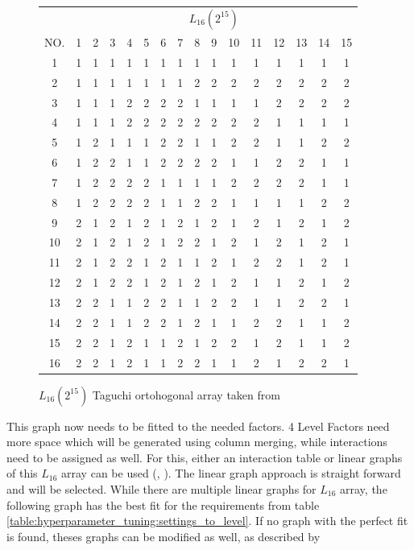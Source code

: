 \begin{figure}[H]
	\centering
\begin{tabular}{ |c||c|c|c|c|c|c|c|c|c|c|c|c|c|c|c|  }
	\hline
	   & \multicolumn{15}{|c|}{ $L_{16}(2^{15})$ } \\
	NO.& 1 & 2 & 3 & 4 & 5 & 6 & 7 & 8 & 9 & 10& 11& 12& 13& 14&15\\
	\hline
	1  & 1 & 1 & 1 & 1 & 1 & 1 & 1 & 1 & 1 & 1 & 1 & 1 & 1 & 1 & 1\\
	2  & 1 & 1 & 1 & 1 & 1 & 1 & 1 & 2 & 2 & 2 & 2 & 2 & 2 & 2 & 2\\
	3  & 1 & 1 & 1 & 2 & 2 & 2 & 2 & 1 & 1 & 1 & 1 & 2 & 2 & 2 & 2\\
	4  & 1 & 1 & 1 & 2 & 2 & 2 & 2 & 2 & 2 & 2 & 2 & 1 & 1 & 1 & 1\\
	5  & 1 & 2 & 1 & 1 & 1 & 2 & 2 & 1 & 1 & 2 & 2 & 1 & 1 & 2 & 2\\
	6  & 1 & 2 & 2 & 1 & 1 & 2 & 2 & 2 & 2 & 1 & 1 & 2 & 2 & 1 & 1\\
	7  & 1 & 2 & 2 & 2 & 2 & 1 & 1 & 1 & 1 & 2 & 2 & 2 & 2 & 1 & 1\\
	8  & 1 & 2 & 2 & 2 & 2 & 1 & 1 & 2 & 2 & 1 & 1 & 1 & 1 & 2 & 2\\
	9  & 2 & 1 & 2 & 1 & 2 & 1 & 2 & 1 & 2 & 1 & 2 & 1 & 2 & 1 & 2\\
	10 & 2 & 1 & 2 & 1 & 2 & 1 & 2 & 2 & 1 & 2 & 1 & 2 & 1 & 2 & 1\\
	11 & 2 & 1 & 2 & 2 & 1 & 2 & 1 & 1 & 2 & 1 & 2 & 2 & 1 & 2 & 1\\
	12 & 2 & 1 & 2 & 2 & 1 & 2 & 1 & 2 & 1 & 2 & 1 & 1 & 2 & 1 & 2\\
	13 & 2 & 2 & 1 & 1 & 2 & 2 & 1 & 1 & 2 & 2 & 1 & 1 & 2 & 2 & 1\\
	14 & 2 & 2 & 1 & 1 & 2 & 2 & 1 & 2 & 1 & 1 & 2 & 2 & 1 & 1 & 2\\
	15 & 2 & 2 & 1 & 2 & 1 & 1 & 2 & 1 & 2 & 2 & 1 & 2 & 1 & 1 & 2\\
	16 & 2 & 2 & 1 & 2 & 1 & 1 & 2 & 2 & 1 & 1 & 2 & 1 & 2 & 2 & 1\\
	\hline
\end{tabular}
\label{table:hyperparameter_tuning:L16_orhtogonal_array}
\caption{ $L_{16}(2^{15})$ Taguchi ortohogonal array taken from \cite{roy_primer_1990}}
\end{figure}


This graph now needs to be fitted to the needed factors. 4 Level Factors need more space which will be generated using column merging, while interactions need to be assigned as well.
For this, either an interaction table or linear graphs of this $L_{16}$ array can be used (\cite{roy_primer_1990}, \cite{nazandanacioglu_taguchi_2005}). 
The linear graph approach is straight forward and will be selected. While there are multiple linear graphs for $L_{16}$ array, the following graph has the best fit for the requirements from table \ref{table:hyperparameter_tuning:settings_to_level}. If no graph with the perfect fit is found, theses graphs can be modified as well, as described by \cite{nazandanacioglu_taguchi_2005}


